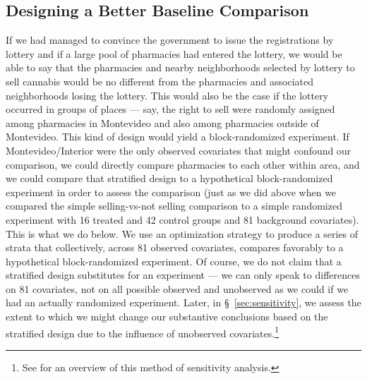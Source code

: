 \documentclass[11pt]{article}
\begin{document}


\subsection{Designing a Better Baseline Comparison}
If we had managed to convince the government to issue the registrations by lottery and if a large pool of pharmacies had entered the lottery, we would be able to say that the pharmacies and nearby neighborhoods selected by lottery to sell cannabis would be no different from the pharmacies and associated neighborhoods losing the lottery. This would also be the case if the lottery occurred in groups of places --- say, the right to sell were randomly assigned among pharmacies in Montevideo and also among pharmacies outside of Montevideo. This kind of design would yield a block-randomized experiment. If Montevideo/Interior were the only observed covariates that might confound our comparison, we could directly compare pharmacies to each other within area, and we could compare that stratified design to a hypothetical block-randomized experiment in order to assess the comparison (just as we did above when we compared the simple selling-vs-not selling comparison to a simple randomized experiment with 16 treated and 42 control groups and 81 background covariates). This is what we do below. We use an optimization strategy to produce a series of strata that collectively, across 81 observed covariates, compares favorably to a hypothetical block-randomized experiment. Of course, we do not claim that a stratified design substitutes for an experiment --- we can only speak to differences on 81 covariates, not on all possible observed and unobserved as we could if we had an actually randomized experiment. Later, in \S~\ref{sec:sensitivity}, we assess the extent to which we might change our substantive conclusions based on the stratified design due to the influence of unobserved covariates.\footnote{See \citep[Chapter 3]{rosenbaum2010design} for an overview of this method of sensitivity analysis.}
\end{document}
